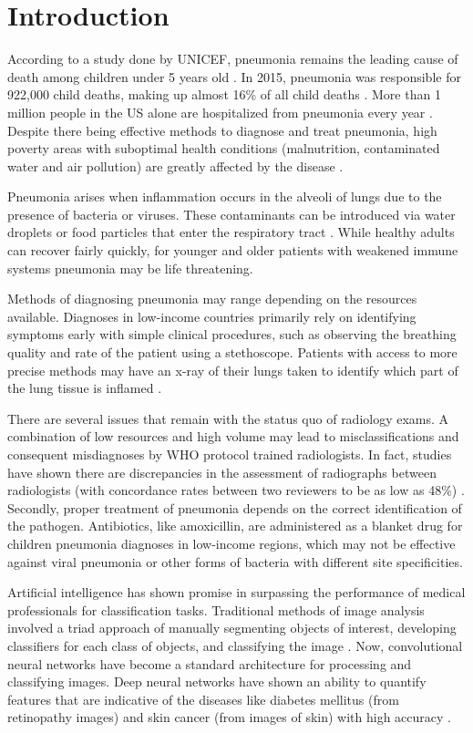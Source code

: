 \documentclass[conference]{IEEEtran}
\begin{document}
\section{Introduction}
According to a study done by UNICEF, pneumonia remains the leading cause of death among children under 5 years old \cite{unicef}. In 2015, pneumonia was responsible for 922,000 child deaths, making up almost 16\% of all child deaths \cite{cdc}. More than 1 million people in the US alone are hospitalized from pneumonia every year \cite{cdc}. Despite there being effective methods to diagnose and treat pneumonia, high poverty areas with suboptimal health conditions (malnutrition, contaminated water and air pollution) are greatly affected by the disease \cite{unicef}. 

Pneumonia arises when inflammation occurs in the alveoli of lungs due to the presence of bacteria or viruses. These contaminants can be introduced via water droplets or food particles that enter the respiratory tract \cite{pneumoniaoverview}. While healthy adults can recover fairly quickly, for younger and older patients with weakened immune systems pneumonia may be life threatening. 

Methods of diagnosing pneumonia may range depending on the resources available. Diagnoses in low-income countries primarily rely on identifying symptoms early with simple clinical procedures, such as observing the breathing quality and rate of the patient using a stethoscope. Patients with access to more precise methods may have an x-ray of their lungs taken to identify which part of the lung tissue is inflamed \cite{pneumoniaoverview}.  

There are several issues that remain with the status quo of radiology exams. A combination of low resources and high volume may lead to misclassifications and consequent misdiagnoses by WHO protocol trained radiologists. In fact, studies have shown there are discrepancies in the assessment of radiographs between radiologists (with concordance rates between two reviewers to be as low as 48\%) \cite{plos}. Secondly, proper treatment of pneumonia depends on the correct identification of the pathogen. Antibiotics, like amoxicillin, are administered as a blanket drug for children pneumonia diagnoses in low-income regions, which may not be effective against viral pneumonia or other forms of bacteria with different site specificities.

Artificial intelligence has shown promise in surpassing the performance of medical professionals for classification tasks. Traditional methods of image analysis involved a triad approach of manually segmenting objects of interest, developing classifiers for each class of objects, and classifying the image \cite{ieee}. Now, convolutional neural networks have become a standard architecture for processing and classifying images. Deep neural networks have shown an ability to quantify features that are indicative of the diseases like diabetes mellitus (from retinopathy images) \cite{retinopathy} and skin cancer (from images of skin) with high accuracy \cite{skincancer}. 
\end{document}
